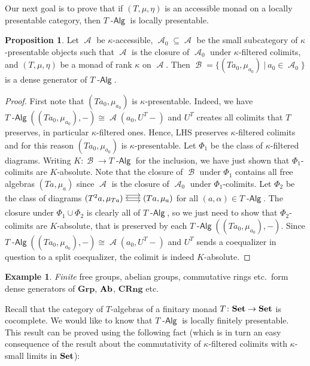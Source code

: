 \documentclass[a4paper,11pt,oneside,openany]{scrbook}
\newcommand{\catname}[1]{{\normalfont\textbf{#1}}}
\DeclareMathOperator{\Alg}{-\mathsf{Alg}}
\newcommand{\Set}{\catname{Set}}
\newcommand{\Ab}{\catname{Ab}}
\DeclareMathOperator{\A}{\mathcal{A}}
\DeclareMathOperator{\B}{\mathcal{B}}
\theoremstyle{definition}
\theoremstyle{definition}
\newtheorem{prop}[thm]{Proposition}
\newtheorem{exmp}[thm]{Example}
\begin{document}
Our next goal is to prove that if $(T,\mu,\eta)$ is an accessible monad on a locally presentable category, then $T\Alg$ is locally presentable.
\begin{prop}
    Let $\A$ be $\kappa$-accessible, $\A_0\subseteq\A$ be the small subcategory of $\kappa$-presentable objects such that $\A$ is the closure of $\A_0$ under $\kappa$-filtered colimits, and $(T,\mu,\eta)$ be a monad of rank $\kappa$ on $\A$. Then $\B=\{ (Ta_0,\mu_{a_0})\ | \ a_0\in\A_0 \}$ is a dense generator of $T\Alg$.
\end{prop}
\begin{proof}
	First note that $(Ta_0,\mu_{a_0})$ is $\kappa$-presentable. Indeed, we have $T\Alg((Ta_0,\mu_{a_0}),-)\cong\A(a_0,U^T-)$ and $U^T$ creates all colimits that $T$ preserves, in particular $\kappa$-filtered ones. Hence, LHS preserves $\kappa$-filtered colimits and for this reason $(Ta_0,\mu_{a_0})$ is $\kappa$-presentable. Let $\Phi_1$  be the class of $\kappa$-filtered diagrams. Writing $K\colon\B\to T\Alg$ for the inclusion, we have just shown that $\Phi_1$-colimits are $K$-absolute. Note that the closure of $\B$ under $\Phi_1$ contains all free algebras $(Ta,\mu_a)$ since $\A$ is the closure of $\A_0$ under $\Phi_1$-colimits. Let $\Phi_2$ be the class of diagrams $\hspace{-1.5mm}\begin{tikzcd}
	(T^2a,\mu_{Ta})\hspace{-1.5mm}\arrow[r, shift right=.5ex, shorten <= .3em, shorten >= .3em]  \arrow[r, shift left=1ex, shorten <= .3em, shorten >= .3em] & \hspace{-1.5mm}(Ta,\mu_a)\arrow[l, shift right=.25ex, shorten <=.3em, shorten >=.3em]
	\end{tikzcd}\hspace{-1.5mm}$ for all $(a,\alpha)\in T\Alg$. The closure under $\Phi_1\cup\Phi_2$ is clearly all of $T\Alg$, so we just need to show that $\Phi_2$-colimits are $K$-absolute, that is preserved by each $T\Alg((Ta_0,\mu_{a_0}),-)$. Since $T\Alg((Ta_0,\mu_{a_0}),-)\cong\A(a_0, U^T-)$ and $U^T$ sends a coequalizer in question to a split coequalizer, the colimit is indeed $K$-absolute.
\end{proof}
\begin{exmp}
	\emph{Finite} free groups, abelian groups, commutative rings etc.\ form dense generators of $\mathbf{Grp}$, $\Ab$, $\mathbf{CRng}$ etc.
\end{exmp}
Recall that the category of $T$-algebras of a finitary monad $T\colon\Set\to\Set$ is cocomplete. We would like to know that $T\Alg$ is locally finitely presentable. This result can be proved using the following fact (which is in turn an easy consequence of the result about the commutativity of $\kappa$-filtered colimits with $\kappa$-small limits in $\Set$):
\end{document}
